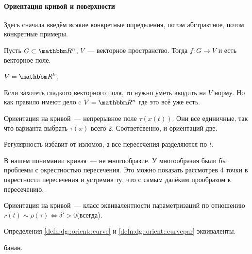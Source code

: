 \documentclass[draft,timbord]{longnotes}
\begin{document}
\paragraph{Ориентация кривой и поверхности}
\label{par:dg::orient}

Здесь сначала введём всякие конкретные определения, потом абстрактное, потом конкретные примеры.

\begin{defn}\label{defn:dg::orient::vecf}
  Пусть $G \subset \R^n$, $V$~--- векторное пространство. Тогда $f \colon G \to V$ и есть векторное 
  поле.
\end{defn}
\begin{exmp}\label{exmp:dg::orient::vecf}
  $V = \R^k$.
\end{exmp}

\begin{rem}\label{rem:dg::orient::vecf} 
  Если захотеть гладкого векторного поля,
  то нужно уметь вводить на $V$ норму.  Но как правило имеют
  дело c $V = \R^n$ где это всё уже есть.
\end{rem}

\begin{defn}\label{defn:dg::orient::curve}
  Ориентация на кривой~--- непрерывное поле $\tau(x(t))$. Они все единичные, так что варианта
  выбрать $\tau(x)$ всего 2. Соответсвенно, и ориентаций две.
\end{defn}
\begin{rem}\label{rem:dg::orient::curvecor}
  Регулярность избавит от изломов, а все пересечения разделяются по $t$.
\end{rem}

\begin{rem}[\flame]\label{rem:dg::orient::curverman}
  В нашем понимании кривая~--- не многообразие. У многообразия были бы проблемы с окрестностью
  пересечения. Это можно показать рассмотрев 4 точки в окрестности пересечения и устремив ту, что
  с самым далёким прообразом к пересечению.
\end{rem}

\begin{defn}\label{defn:dg::orient::curvepar}
  Ориентация на кривой~--- класс эквивалентности параметризаций по отношению
  $r(t) \sim \rho(\tau )  \Leftrightarrow  \delta' > 0$(всегда). 
\end{defn}

\begin{prop}\label{prop:dg::orient::eqcurve}
  Определения \ref{defn:dg::orient::curve} и \ref{defn:dg::orient::curvepar} эквиваленты.
\end{prop}
\begin{lproof}
  банан.
\end{lproof}
\end{document}
